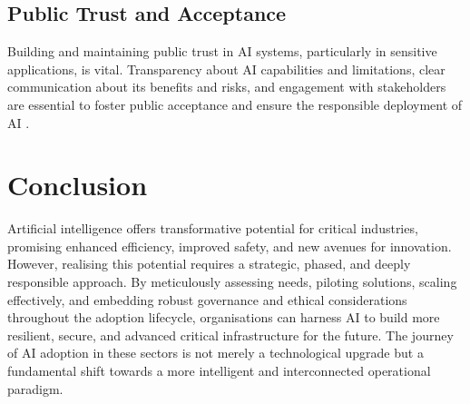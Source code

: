 \subsection{Public Trust and Acceptance}

Building and maintaining public trust in AI systems, particularly in sensitive applications, is vital. Transparency about AI capabilities and limitations, clear communication about its benefits and risks, and engagement with stakeholders are essential to foster public acceptance and ensure the responsible deployment of AI \parencite{leyliabadi2025conceptual}.

\section{Conclusion}

Artificial intelligence offers transformative potential for critical industries, promising enhanced efficiency, improved safety, and new avenues for innovation. However, realising this potential requires a strategic, phased, and deeply responsible approach. By meticulously assessing needs, piloting solutions, scaling effectively, and embedding robust governance and ethical considerations throughout the adoption lifecycle, organisations can harness AI to build more resilient, secure, and advanced critical infrastructure for the future. The journey of AI adoption in these sectors is not merely a technological upgrade but a fundamental shift towards a more intelligent and interconnected operational paradigm.
